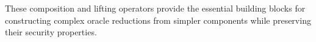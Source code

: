 These composition and lifting operators provide the essential building blocks for constructing complex oracle reductions from simpler components while preserving their security properties.






